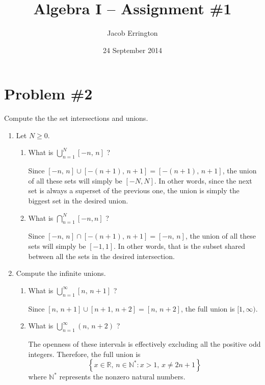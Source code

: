 \documentclass{article}
\author{Jacob Errington}
\date{24 September 2014}
\title{Algebra I -- Assignment \#1}
\newcommand{\R}{\mathbb{R}}
\newcommand{\N}{\mathbb{N}}
\begin{document}
\maketitle

\section*{Problem \#2}

Compute the the set intersections and unions.

\begin{enumerate}
    \item Let $N \geq 0$. 
        
        \begin{enumerate}
            \item What is $\bigcup_{n=1}^N \left[-n,\,n\right]$ ?

                Since $[-n,\,n] \cup [-(n+1),\, n+1] = [-(n+1),\, n+1]$, the union of all
                these sets will simply be $[-N, N]$. In other words, since the next set
                is always a superset of the previous one, the union is simply the biggest
                set in the desired union.

            \item What is $\bigcap_{n=1}^N [-n, n]$ ?

                Since $[-n,\,n] \cap [-(n+1),\, n+1] = [-n,\, n]$, the union of all these
                sets will simply be $[-1, 1]$. In other words, that is the subset shared
                between all the sets in the desired intersection.
        \end{enumerate}

    \item Compute the infinite unions.
        
        \begin{enumerate}
            \item What is $\bigcup_{n=1}^\infty [n,\, n+1]$ ?

                Since $[n,\, n+1] \cup [n+1,\, n+2] = [n,\, n+2]$, the full union is 
                $[1, \infty)$.

            \item What is $\bigcup_{n=1}^\infty (n,\, n+2)$ ?

                The openness of these intervals is effectively excluding all the positive
                odd integers. Therefore, the full union is
                \begin{equation*}
                    \left\{ x \in \R,\, n \in \N^*: x > 1,\, x \neq 2n + 1 \right\}
                \end{equation*}
                where $\N^*$ represents the nonzero natural numbers.
        \end{enumerate}


\end{enumerate}
\end{document}
